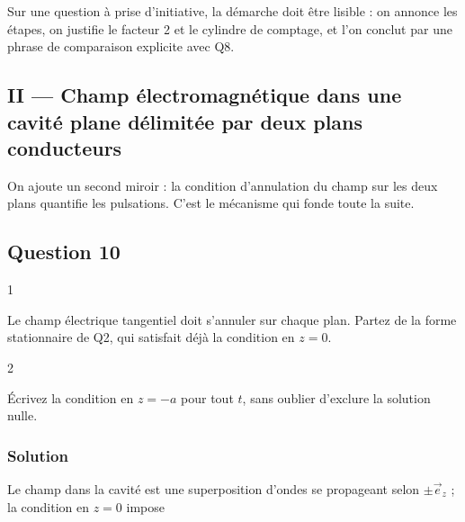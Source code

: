 \documentclass[11pt,a4paper]{article}
\newcommand{\equationajustee}[1]{%
  \sbox{\boiteequation}{$\displaystyle #1$}%
  \ifdim\wd\boiteequation>\linewidth
    \[\resizebox{\linewidth}{!}{\usebox{\boiteequation}}\]%
  \else
    \[#1\]%
  \fi}
\begin{document}
\begin{jury}

Sur une question à prise d'initiative, la démarche doit être lisible : on annonce les étapes, on justifie le facteur 2 et le cylindre de comptage, et l'on conclut par une phrase de comparaison explicite avec Q8.

\end{jury}

\hypertarget{ii-champ-uxe9lectromagnuxe9tique-dans-une-cavituxe9-plane-duxe9limituxe9e-par-deux-plans-conducteurs}{%
\subsection{II --- Champ électromagnétique dans une cavité plane délimitée par deux plans conducteurs}\label{ii-champ-uxe9lectromagnuxe9tique-dans-une-cavituxe9-plane-duxe9limituxe9e-par-deux-plans-conducteurs}}

On ajoute un second miroir : la condition d'annulation du champ sur les deux plans quantifie les pulsations. C'est le mécanisme qui fonde toute la suite.

\hypertarget{question-10}{%
\subsection{Question 10}\label{question-10}}

\begin{indication}{1}

Le champ électrique tangentiel doit s'annuler sur chaque plan. Partez de la forme stationnaire de Q2, qui satisfait déjà la condition en \(z=0\).

\end{indication}

\begin{indication}{2}

Écrivez la condition en \(z=-a\) pour tout \(t\), sans oublier d'exclure la solution nulle.

\end{indication}

\hypertarget{solution-9}{%
\subsubsection{Solution}\label{solution-9}}

Le champ dans la cavité est une superposition d'ondes se propageant selon \(\pm\vec e_z\) ; la condition en \(z=0\) impose

\equationajustee{\vec E=E_{0t}\sin(\omega z/c)\sin(\omega t)\,\vec e_x}
\end{document}
